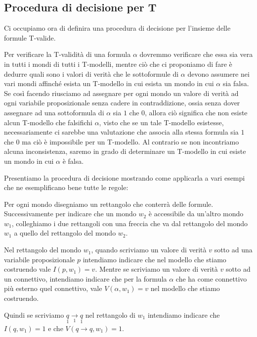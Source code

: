 \documentclass[a4paper, titlepage, 12pt]{report}
\begin{document}
\subsection{Procedura di decisione per T}
Ci occupiamo ora di definira una procedura di decisione per l'insieme delle formule T-valide.

Per verificare la T-validità di una formula $\alpha$ dovremmo verificare che essa sia vera in tutti
i mondi di tutti i T-modelli, mentre ciò che ci proponiamo di fare è dedurre quali sono i valori di verità
che le sottoformule di $\alpha$ devono assumere nei vari mondi affinché esista un T-modello
in cui esista un mondo in cui $\alpha$ sia falsa.
Se così facendo riusciamo ad assegnare per ogni mondo un valore di verità ad ogni variabile proposizionale
senza cadere in contraddizione, ossia senza dover assegnare ad una sottoformula di $\alpha$ sia $1$ che $0$,
allora ciò significa che non esiste alcun T-modello che falsifichi $\alpha$, visto che se un tale T-modello
esistesse, necessariamente ci sarebbe una valutazione che associa
alla stessa formula sia $1$ che $0$ ma ciò è impossibile per un T-modello.
Al contrario se non incontriamo alcuna inconsistenza, saremo in grado
di determinare un T-modello in cui esiste un mondo in cui $\alpha$ è falsa.

Presentiamo la procedura di decisione mostrando come applicarla a vari esempi che ne
esemplificano bene tutte le regole:

Per ogni mondo disegniamo un rettangolo che conterrà delle formule.
Successivamente per indicare che un mondo $w_2$ è accessibile da un'altro mondo $w_1$,
colleghiamo i due rettangoli con una freccia che va dal rettangolo del mondo $w_1$
a quello del rettangolo del mondo $w_2$.

Nel rettangolo del mondo $w_1$, quando scriviamo un valore di verità $v$ sotto ad una
variabile proposizionale $p$ intendiamo indicare che nel modello che stiamo costruendo
vale $I(p, w_1) = v$.
Mentre se scriviamo un valore di verità $v$ sotto ad un connettivo, intendiamo indicare
che per la formula $\alpha$ che ha come connettivo più esterno quel connettivo,
vale $V(\alpha, w_1) = v$ nel modello che stiamo costruendo.

Quindi se scriviamo
$\underset{1}{q} \underset{1}{\rightarrow} \underset{1}{q}$ nel rettangolo di $w_1$
intendiamo indicare che $I(q, w_1) = 1$ e che $V(q \rightarrow q, w_1) = 1$.
\end{document}

